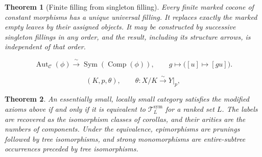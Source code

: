 \documentclass[10pt,a4paper]{amsart}
\newtheorem{theorem}{Theorem}
\newcommand{\C}{\mathcal C}
\newcommand{\Comp}{\operatorname{Comp}}
\begin{document}
\begin{theorem}[Finite filling from singleton filling]\label{thm:finite}
Every finite marked cocone of constant morphisms has a unique universal filling. It replaces exactly
the marked empty leaves by their assigned objects. It may be constructed
by successive singleton fillings in any order, and the result, including
its structure arrows, is independent of that order.
\end{theorem}

\begin{equation}\label{concl:corolla-symmetry}
 \operatorname{Aut}_{\C}(\phi)
 \xrightarrow{\ \sim\ }\operatorname{Sym}(\Comp(\phi)),
 \qquad g\longmapsto\bigl([u]\longmapsto[gu]\bigr).
\end{equation}

\begin{equation}\label{concl:symmetric-matching}
 (K,p,\theta),\qquad
 \theta:X/K\xrightarrow{\sim}Y|_p,
\end{equation}

\begin{theorem}\label{concl:symmetric-representation}
An essentially small, locally small category satisfies the modified
axioms above if and only if it is equivalent to
$\mathcal T_L^{\mathrm{sym}}$ for a ranked set $L$. The labels are
recovered as the isomorphism classes of corollas, and their arities
are the numbers of components. Under the equivalence, epimorphisms
are prunings followed by tree isomorphisms, and strong monomorphisms
are entire-subtree occurrences preceded by tree isomorphisms.
\end{theorem}
\end{document}
